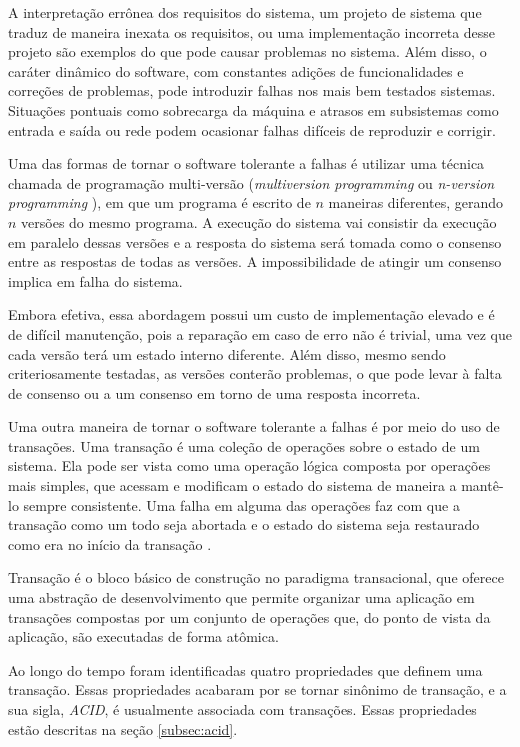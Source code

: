\documentclass[11pt,twoside,a4paper]{book}
\begin{document}
A interpretação errônea dos requisitos do sistema, um projeto de sistema que traduz de maneira inexata os requisitos, ou uma implementação incorreta desse projeto são exemplos do que pode causar problemas no sistema. Além disso, o caráter dinâmico do software, com constantes adições de funcionalidades e correções de problemas, pode introduzir falhas nos mais bem testados sistemas. Situações pontuais como sobrecarga da máquina e atrasos em subsistemas como entrada e saída ou rede podem ocasionar falhas difíceis de reproduzir e corrigir.

Uma das formas de tornar o software tolerante a falhas é utilizar uma técnica chamada de programação multi-versão (\emph{multiversion programming} ou \emph{n-version programming} \cite{n_version}), em que um programa é escrito de $n$ maneiras diferentes, gerando $n$ versões do mesmo programa. A execução do sistema vai consistir da execução em paralelo dessas versões e a resposta do sistema será tomada como o consenso entre as respostas de todas as versões. A impossibilidade de atingir um consenso implica em falha do sistema.

Embora efetiva, essa abordagem possui um custo de implementação elevado e é de difícil manutenção, pois a reparação em caso de erro não é trivial, uma vez que cada versão terá um estado interno diferente. Além disso, mesmo sendo criteriosamente testadas, as versões conterão problemas, o que pode levar à falta de consenso ou a um consenso em torno de uma resposta incorreta.

Uma outra maneira de tornar o software tolerante a falhas é por meio do uso de transações. Uma transação é uma coleção de operações sobre o estado de um sistema. Ela pode ser vista como uma operação lógica composta por operações mais simples, que acessam e modificam o estado do sistema de maneira a mantê-lo sempre consistente. Uma falha em alguma das operações faz com que a transação como um todo seja abortada e o estado do sistema seja restaurado como era no início da transação \cite{garcia-molina, vaca, gray}.

Transação é o bloco básico de construção no paradigma transacional, que oferece uma abstração de desenvolvimento que permite organizar uma aplicação em transações compostas por um conjunto de operações que, do ponto de vista da aplicação, são executadas de forma atômica. 

Ao longo do tempo foram identificadas quatro propriedades que definem uma transação. Essas propriedades acabaram por se tornar sinônimo de transação, e a sua sigla, \emph{ACID}, é usualmente associada com transações. Essas propriedades estão descritas na seção \ref{subsec:acid}.
\end{document}
